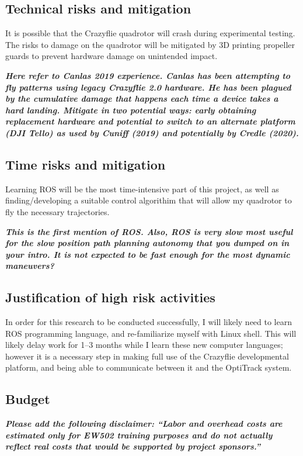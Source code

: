 \documentclass[onecolumn,10pt]{IEEEtran}
\begin{document}
\subsection{Technical risks and mitigation}
It is possible that the Crazyflie quadrotor will crash during experimental testing. The risks to damage on the quadrotor will be mitigated by 3D printing propeller guards to prevent hardware damage on unintended impact.

\emph{\textbf{Here refer to Canlas 2019 experience. Canlas has been attempting to fly patterns using legacy Crazyflie 2.0 hardware. He has been plagued by the cumulative damage that happens each time a device takes a hard landing. Mitigate in two potential ways: early obtaining replacement hardware and potential to switch to an alternate platform (DJI Tello) as used by Cuniff (2019) and potentially by Credle (2020). }}

\subsection{Time risks and mitigation}
Learning ROS will be the most time-intensive part of this project, as well as finding/developing  a suitable control algorithim that will allow my quadrotor to fly the necessary trajectories. 

\emph{\textbf{This is the first mention of ROS. Also, ROS is very slow most useful for the slow position path planning autonomy that you dumped on in your intro. It is not expected to be fast enough for the most dynamic maneuvers?}}

\subsection{Justification of high risk activities}
In order for this research to be conducted successfully, I will likely need to learn ROS programming language, and re-familiarize myself with Linux shell. This will likely delay work for \numrange{1}{3} months while I learn these new computer languages; however it is a necessary step in making full use of the Crazyflie developmental platform, and being able to communicate between it and the OptiTrack system.

\subsection{Budget}
\emph{\textbf{Please add the following disclaimer: ``Labor and overhead costs are estimated only for EW502 training purposes and do not actually reflect real costs that would be supported by project sponsors.''}}
\end{document}
